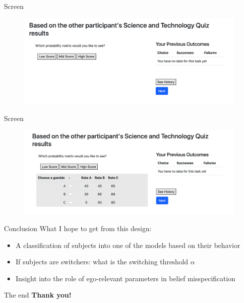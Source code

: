 \documentclass[aspectratio=169]{beamer}
\begin{document}

\begin{frame}{Screen}
    \begin{figure}
        \centering
        \includegraphics[scale=.4]{figures2/screen1.png}
    \end{figure}
\end{frame}

\begin{frame}{Screen}
    \begin{figure}
        \centering
        \includegraphics[scale=.4]{figures2/screen2.png}
    \end{figure}
\end{frame}


\begin{frame}{Conclusion}
What I hope to get from this design:\\
\bigskip
    \begin{itemize}
        \item A classification of subjects into one of the models based on their behavior\\
        \bigskip
        \item If subjects are switchers: what is the switching threshold $\alpha$\\
        \bigskip
        \item Insight into the role of ego-relevant parameters in belief misspecification
    \end{itemize}
\end{frame}

\begin{frame}{The end}
    \large\textbf{Thank you!}
\end{frame}
\end{document}
